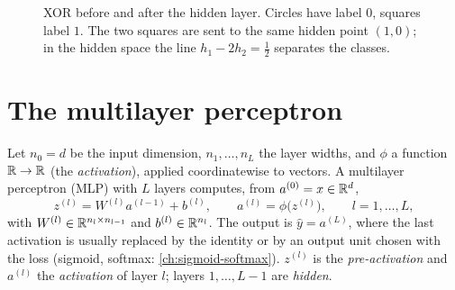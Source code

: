 \begin{notechapter}
\begin{figure}[ht]
\centering
{}
\caption{XOR before and after the hidden layer. Circles have label $0$, squares label $1$.
The two squares are sent to the same hidden point $(1,0)$; in the hidden space the
line $h_1 - 2h_2 = \frac12$ separates the classes.}
\label{feedforward-networks:fig:xor}
\end{figure}

\section{The multilayer perceptron}\label{feedforward-networks:sec:mlp}

\begin{definition}\label{feedforward-networks:def:mlp}
Let $n_0 = d$ be the input dimension, $n_1,\dots,n_L$ the layer widths, and $\phi$ a function
$\mathbb{R}\to\mathbb{R}$ (the \emph{activation}), applied coordinatewise to vectors. A multilayer perceptron
(MLP) with $L$ layers computes, from $a^{(0)} = x\in\mathbb{R}^d$,
\[
  z^{(l)} = W^{(l)}a^{(l-1)} + b^{(l)},\qquad a^{(l)} = \phi\bigl(z^{(l)}\bigr),\qquad l = 1,\dots,L,
\]
with $W^{(l)}\in\mathbb{R}^{n_l\times n_{l-1}}$ and $b^{(l)}\in\mathbb{R}^{n_l}$. The output is $\hat y = a^{(L)}$, where the last
activation is usually replaced by the identity or by an output unit chosen with the loss
(sigmoid, softmax: \cref{ch:sigmoid-softmax}). $z^{(l)}$ is the \emph{pre-activation} and $a^{(l)}$ the
\emph{activation} of layer $l$; layers $1,\dots,L - 1$ are \emph{hidden}.
\end{definition}


\end{notechapter}

